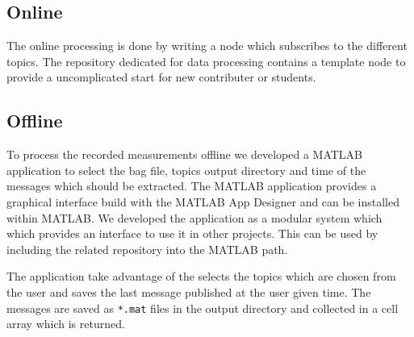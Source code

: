 \subsection{Online}\label{ch:realization:ssec:online}

The online processing is done by writing a node which subscribes to the different topics.
The repository dedicated for data processing contains a template node to provide a uncomplicated start for new contributer or students.

\subsection{Offline}\label{ch:realization:ssec:offline}

To process the recorded measurements offline we developed a MATLAB application to select the bag file, topics output directory and time of the messages which should be extracted.
The MATLAB application provides a graphical interface build with the MATLAB App Designer and can be installed within MATLAB.
We developed the application as a modular system which which provides an interface to use it in other projects.
This can be used by including the related repository into the MATLAB path.

The application take advantage of the selects the topics which are chosen from the user and saves the last message published at the user given time.
The messages are saved as \texttt{*.mat} files in the output directory and collected in a cell array which is returned.
